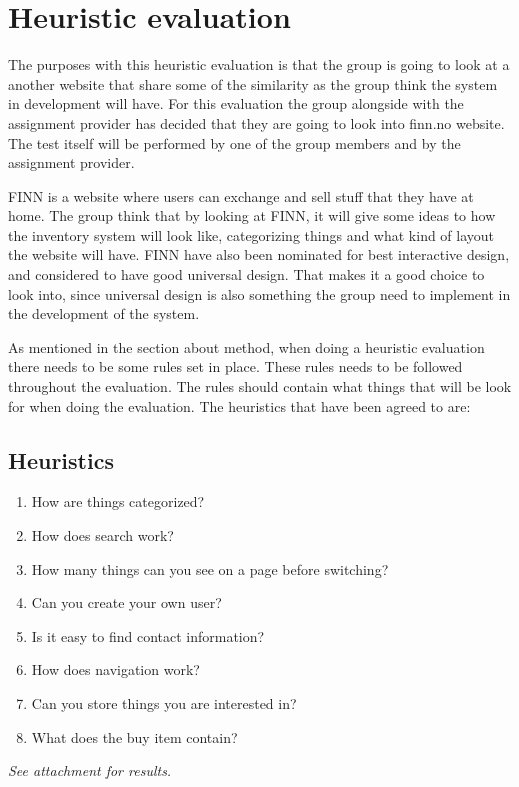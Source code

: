 \section{Heuristic evaluation}
The purposes with this heuristic evaluation is that the group is going to look at a another website that share some of the similarity as the group think the system in development will have. For this evaluation the group alongside with the assignment provider has decided that they are going to look into finn.no website. The test itself will be performed by one of the group members and by the assignment provider.

FINN is a website where users can exchange and sell stuff that they have at home. The group think that by looking at FINN, it will give some ideas to how the inventory system will look like, categorizing things and what kind of layout the website will have. FINN have also been nominated for best interactive design,
and considered to have good universal design.\cite{finn_nominert}
That makes it a good choice to look into, since universal design is also something the group need to implement in the development of the system. 

As mentioned in the section about method, when doing a heuristic evaluation there needs to be some rules set in place. These rules needs to be followed throughout the evaluation. The rules should contain what things that will be look for when doing the evaluation. The heuristics that have been agreed to are:

\subsection{Heuristics}
\begin{enumerate}
  \item How are things categorized?
  \item How does search work?
  \item How many things can you see on a page before switching? 
  \item Can you create your own user?
  \item Is it easy to find contact information?
  \item How does navigation work?
  \item Can you store things you are interested in?
  \item What does the buy item contain?
 \end{enumerate}

\textit{See attachment for results.}

